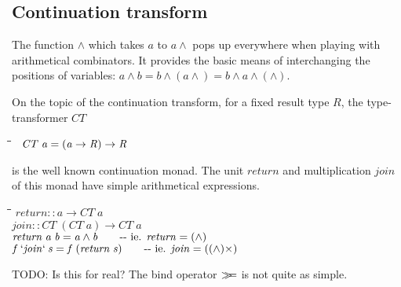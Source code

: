 \documentclass{article}
\newlength{\lwidth}\setlength{\lwidth}{4.5cm}
\newlength{\cwidth}\setlength{\cwidth}{8mm} %
\newcommand{\Conid}[1]{\mathit{#1}}
\newcommand{\Varid}[1]{\mathit{#1}}
\newcommand{\bind}{\mathbin{>\!\!\!>\mkern-6.7mu=}}
\begin{document}
\subsection{Continuation transform}

The function \ensuremath{\wedge} which takes \ensuremath{\Varid{a}} to \ensuremath{\Varid{a}\wedge} pops up everywhere when playing
with arithmetical combinators.
It provides the basic means of interchanging the positions
of variables:
\ensuremath{\Varid{a}\wedge\Varid{b}\mathrel{=}\Varid{b}\wedge(\Varid{a}\wedge)\mathrel{=}\Varid{b}\wedge\Varid{a}\wedge(\wedge)}.

On the topic of the continuation transform, for a fixed result type
\ensuremath{\Conid{R}}, the type-transformer \ensuremath{\Conid{CT}}
\begin{tabbing}
\qquad\=\hspace{\lwidth}\=\hspace{\cwidth}\=\+\kill
${\hskip0.50em\relax\Conid{CT}\;\Varid{a}\mathrel{=}(\Varid{a}\to \Conid{R})\to \Conid{R}}$
\end{tabbing}is the well known continuation monad.  The unit \ensuremath{\Varid{return}} and multiplication \ensuremath{\Varid{join}} 
of this monad have simple arithmetical expressions. 
\begin{tabbing}
\qquad\=\hspace{\lwidth}\=\hspace{\cwidth}\=\+\kill
${\Varid{return}\mathbin{::}\Varid{a}\to \Conid{CT}\;\Varid{a}}$\\
${\Varid{join}\mathbin{::}\Conid{CT}\;(\Conid{CT}\;\Varid{a})\to \Conid{CT}\;\Varid{a}}$\\
${\Varid{return}\;\Varid{a}\;\Varid{b}\mathrel{=}\Varid{a}\wedge\Varid{b}\mbox{\qquad-{}-  ie. \ensuremath{\Varid{return}\mathrel{=}(\wedge)}}}$\\
${\Varid{f}\mathbin{`\Varid{join}`}\Varid{s}\mathrel{=}\Varid{f}\;(\Varid{return}\;\Varid{s})\mbox{\qquad-{}-  ie. \ensuremath{\Varid{join}\mathrel{=}((\wedge)\times)}}}$
\end{tabbing}
TODO: Is this for real?
The bind operator \ensuremath{\bind } is not quite as simple.
\end{document}

